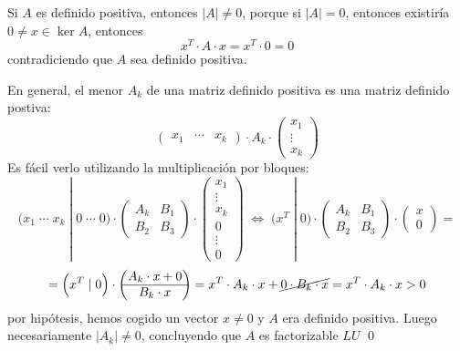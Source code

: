     \begin{dem}
        Si $A$ es definido positiva, entonces $|A|\neq 0$, porque si $|A|=0$, entonces existiría $ 0 \neq x  \in \ker A$, entonces
        $$x^T \cdot A \cdot x=x^T \cdot 0 = 0 $$
        contradiciendo que $A$ sea definido positiva.

        En general, el menor $A_k$ de una matriz definido positiva es una matriz definido postiva:
        $$\begin{pmatrix}
            x_1 & \cdots & x_k
        \end{pmatrix}\cdot A_k \cdot \begin{pmatrix}
            x_1 \\ \vdots \\ x_k
        \end{pmatrix} $$
        Es fácil verlo utilizando la multiplicación por bloques:
        $$\Big(
            x_1 \;\cdots \; x_k \; | \;  0 \; \cdots \; 0  
        \Big)\cdot \left(\begin{array}{c|c}
             A_k & B_1  \\
             \hline B_2 &B_3 
        \end{array}\right) \cdot \begin{pmatrix}
            x_1 \\ \vdots \\ x_k \\ \hline  0 \\ \vdots \\ 0
        \end{pmatrix} \; \iff \; \Big(x^T \; | \; 0 \Big) \cdot \left(\begin{array}{c|c}
             A_k & B_1 \\
             \hline B_2 &B_3 
        \end{array}\right) \cdot \begin{pmatrix}
           x \\ \hline 0 
        \end{pmatrix} =$$
        $$=\Big(x^T \; | \; 0 \Big)\cdot \begin{pmatrix}
           A_k\cdot x+0\\ \hline B_k\cdot x 
        \end{pmatrix}=x^T\cdot A_k \cdot x+\cancel{0\cdot B_k \cdot x}=x^T\cdot A_k \cdot x > 0$$
        por hipótesis, hemos cogido un vector $x \neq 0$ y $A$ era definido positiva. Luego necesariamente $|A_k|\neq 0$, concluyendo que $A$ es factorizable $LU$
    \qed\end{dem}
